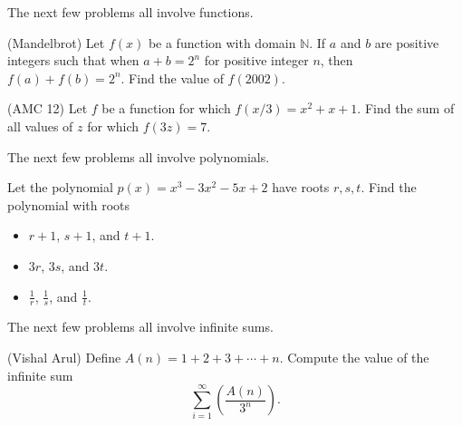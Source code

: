 \begin{comment}  

Another way to find $A_3$ and $A_4$ are by expanding:

When we cube $A_1$, we find: $$\left(x+\frac{1}{x}\right)^3=x^3+3x^2 \frac{1}{x}+3x \frac{1}{x^2}+\frac{1}{x^3}=x^3+3x+\frac{3}{x}+\frac{1}{x^3}\implies A_3=A_1^3-3A_1.$$

When we square $A_2$, we find $$\left(x^2+\frac{1}{x^2}\right)^2=x^4+2\cdot x^2\cdot \frac{1}{x^2}+\frac{1}{x^4}=x^4+2+\frac{1}{x^4}.$$
Remembering that $A_2=A_1^2-2$ from before, we now have \begin{eqnarray*}  A_4=x^4+\frac{1}{x^4}&=&\left(x^2+\frac{1}{x^2}\right)^2-2 \\ &=&\left(A_1^2-2\right)^2-2=A_1^4-4A_1^2+2 \end{eqnarray*}  \end{comment}  

The next few problems all involve functions.  

\begin{exmp}(Mandelbrot)  Let $f(x)$ be a function with domain $\mathbb{N}$.  If $a$ and $b$ are positive integers such that when $a+b=2^n$ for positive integer $n$, then $f(a)+f(b)=2^n$.  Find the value of $f(2002)$.  \end{exmp}

\begin{exmp}(AMC 12)  Let $f$ be a function for which $f(x/3) = x^2 + x + 1$. Find the sum of all values of $z$ for which $f(3z) = 7$. \end{exmp}

The next few problems all involve polynomials.

\begin{exmp}  Let the polynomial $p(x)=x^3-3x^2-5x+2$ have roots $r,s,t$.  Find the polynomial with roots 
	\begin{itemize}
		\item $r+1$, $s+1$, and $t+1$.
		\item $3r$, $3s$, and $3t$.
		\item $\frac{1}{r}$, $\frac{1}{s}$, and $\frac{1}{t}$.
	\end{itemize}
\end{exmp}

The next few problems all involve infinite sums.

\begin{exmp}(Vishal Arul)  Define $A(n)=1+2+3+\cdots+n$.  Compute the value of the infinite sum $$\sum_{i=1}^{\infty}\left(\frac{A(n)}{3^n}\right).$$ \end{exmp}




